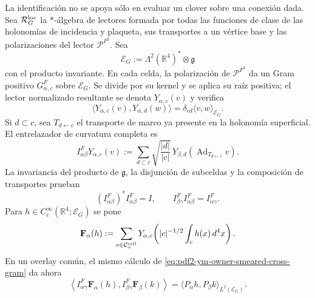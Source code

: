 La identificación no se apoya sólo en evaluar un clover sobre una conexión dada.
Sea $\mathcal R_G^{\rm loc}$ la $*$-álgebra de lectores formada por todas las
funciones de clase de las holonomías de incidencia y plaqueta, sus transportes a un
vértice base y las polarizaciones del lector $\mathcal P^{F^2}$. Sea
\begin{equation}\label{eq:pdf2-ym-owner-curvature-fibre}
 \mathcal E_G:=\Lambda^2(\mathbb R^4)^*\otimes\mathfrak g
\end{equation}
con el producto invariante. En cada celda, la polarización de
$\mathcal P^{F^2}$ da un Gram positivo $G_{\alpha,c}^{F}$ sobre
$\mathcal E_G$. Se divide por su kernel y se aplica su raíz positiva; el lector
normalizado resultante se denota $Y_{\alpha,c}(v)$ y verifica
\begin{equation}\label{eq:pdf2-ym-owner-curvature-cell-gram}
 \langle Y_{\alpha,c}(v),Y_{\alpha,d}(w)\rangle
 =\delta_{cd}\langle v,w\rangle_{\mathcal E_G}.
\end{equation}
Si $d\subset c$, sea $T_{d\leftarrow c}$ el transporte de marco ya presente en la
holonomía superficial. El entrelazador de curvatura completa es
\begin{equation}\label{eq:pdf2-ym-owner-curvature-intertwiner}
 I_{\alpha\beta}^{F}Y_{\alpha,c}(v)
 :=\sum_{d\subset c}\sqrt{\frac{|d|}{|c|}}\,
 Y_{\beta,d}\!\left(\operatorname{Ad}_{T_{d\leftarrow c}}v\right).
\end{equation}
La invariancia del producto de $\mathfrak g$, la disjunción de subceldas y la
composición de transportes prueban
\begin{equation}\label{eq:pdf2-ym-owner-curvature-intertwiner-identities}
 (I_{\alpha\beta}^{F})^*I_{\alpha\beta}^{F}=I,
 \qquad
 I_{\beta\gamma}^{F}I_{\alpha\beta}^{F}=I_{\alpha\gamma}^{F}.
\end{equation}
Para $h\in C_c^\infty(\mathbb R^4;\mathcal E_G)$ se pone
\begin{equation}\label{eq:pdf2-ym-owner-f-alpha}
 \mathbf F_\alpha(h):=
 \sum_{c\in\mathcal C_\alpha^{\rm cell}}
 Y_{\alpha,c}\!\left(
   |c|^{-1/2}\int_c h(x)\,d^4x\right).
\end{equation}
En un overlay común, el mismo cálculo de
\eqref{eq:pdf2-ym-owner-smeared-cross-gram} da ahora
\begin{equation}\label{eq:pdf2-ym-owner-curvature-cross-gram}
 \left\langle I_{\alpha\gamma}^{F}\mathbf F_\alpha(h),
 I_{\beta\gamma}^{F}\mathbf F_\beta(k)\right\rangle
 =\langle P_\alpha h,P_\beta k\rangle_{L^2(\mathcal E_G)}.
\end{equation}
